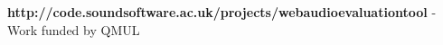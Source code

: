
\colorbox{qmuldarkblue}
{
 \color{white}
 \parbox{\textwidth}
 {

  \begin{center}

  
\textbf{http://code.soundsoftware.ac.uk/projects/webaudioevaluationtool} - Work funded by QMUL
  
  \end{center}

  \vspace{-1cm}
 }
}
